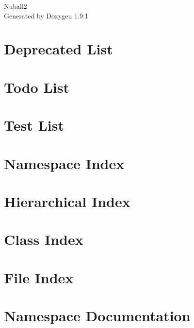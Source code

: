 \let\mypdfximage\pdfximage\def\pdfximage{\immediate\mypdfximage}\documentclass[twoside]{book}
\newcommand{\+}{\discretionary{\mbox{\scriptsize$\hookleftarrow$}}{}{}}
\newcommand{\clearemptydoublepage}{%
  \newpage{\pagestyle{empty}\cleardoublepage}%
}
\begin{document}
\raggedbottom

\begin{titlepage}
\vspace*{7cm}
\begin{center}%
{\Large Nuball2 }\\
\vspace*{1cm}
{\large Generated by Doxygen 1.9.1}\\
\end{center}
\end{titlepage}
\clearemptydoublepage
{}
\tableofcontents
\clearemptydoublepage
{}

\chapter{Deprecated List}
\label{deprecated}

\chapter{Todo List}
\label{todo}

\chapter{Test List}
\label{test}

\chapter{Namespace Index}

\chapter{Hierarchical Index}

\chapter{Class Index}

\chapter{File Index}

\chapter{Namespace Documentation}




\end{document}
